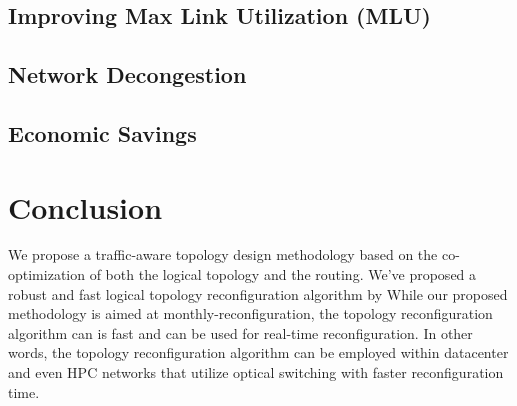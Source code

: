 \documentclass[sigconf]{acmart}
\begin{document}
\subsection{Improving Max Link Utilization (MLU)}
\subsection{Network Decongestion}
\subsection{Economic Savings}

\section{Conclusion}
We propose a traffic-aware topology design methodology based on the co-optimization of both the logical topology and the routing. We've proposed a robust and fast logical topology reconfiguration algorithm by While our proposed methodology is aimed at monthly-reconfiguration, the topology reconfiguration algorithm can is fast and can be used for real-time reconfiguration. In other words, the topology reconfiguration algorithm can be employed within datacenter and even HPC networks that utilize optical switching with faster reconfiguration time.

\newpage


\end{document}
